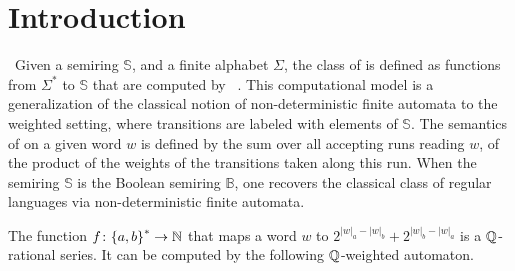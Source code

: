 \section{Introduction}\label{introduction:sec}

\AP\ Given a semiring $\mathbb{S}$, and a finite alphabet $\Sigma$, the class
of  is defined as
functions from $\Sigma^*$ to $\mathbb{S}$ that are computed by
~\cite{BERE10}. This computational model is
a generalization of the classical notion of non-deterministic finite automata
to the weighted setting, where transitions are labeled with elements of
$\mathbb{S}$. The semantics of  on a given
word $w$ is defined by the sum over all accepting runs reading $w$, of the
product of the weights of the transitions taken along this run. When the
semiring $\mathbb{S}$ is the Boolean semiring $\mathbb{B}$, one recovers the
classical class of regular languages via non-deterministic finite automata.

\begin{example}\label{ab-ba-power-two:ex}
  The function $f \colon \mathopen{\{} a,b \mathclose{\}}^* \to \mathbb{N}$ that maps a word $w$ to
  $2^{|w|_a - |w|_b} + 2^{|w|_b - |w|_a}$ is a
  $\mathbb{Q}$-rational series.
  It can be computed by the following $\mathbb{Q}$-weighted automaton.
  \begin{center}
  \end{center}
\end{example}


